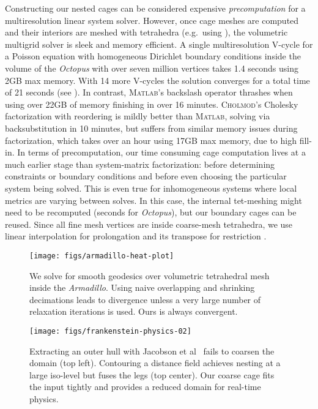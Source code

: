 Constructing our nested cages can be considered expensive \emph{precomputation}
for a multiresolution linear system solver.
%
However, once cage meshes are computed and their interiors are meshed with
tetrahedra (e.g.\ using \cite{tetgen}),
the volumetric multigrid solver is sleek and memory efficient.
%
A single multiresolution V-cycle for a Poisson equation with homogeneous
Dirichlet boundary conditions inside the volume of the \emph{Octopus} with over
seven million vertices takes 1.4 seconds using 2GB max memory. With 14 more
V-cycles the solution converges for a total time of 21 seconds (see
).
%
In contrast, \textsc{Matlab}'s backslash operator thrashes when using over 22GB
of memory finishing in over 16 minutes.
%
\textsc{Cholmod}'s Cholesky factorization with reordering is mildly better than
\textsc{Matlab}, solving via backsubstitution in 10 minutes, but suffers from
similar memory issues during factorization, which takes over
an hour using 17GB max memory, due to high fill-in.
%
In terms of precomputation, our time consuming cage computation lives at a much
earlier stage than system-matrix factorization: before determining constraints
or boundary conditions and before even choosing the particular system being
solved.
%
This is even true for inhomogeneous systems where local metrics are
varying between solves. In this case, the internal tet-meshing might need to be
recomputed (seconds for \emph{Octopus}), but our boundary cages can be reused.
%
Since all fine mesh vertices are inside coarse-mesh tetrahedra, we use linear
interpolation for prolongation and its transpose for restriction
\cite{Demmel04}.

\begin{figure}
  \texttt{[image: figs/armadillo-heat-plot]}
  \caption{We solve for smooth geodesics over volumetric tetrahedral mesh
  inside the \emph{Armadillo}. Using naive overlapping and
  shrinking decimations leads to divergence unless a very large number of
  relaxation iterations is used.  Ours is always convergent.}
  \label{fig:armadillo-heat-plot}
\end{figure}
\begin{figure}
  \texttt{[image: figs/frankenstein-physics-02]}
  \caption{Extracting an outer hull with Jacobson et al~\protect{} fails to coarsen the domain (top
  left). Contouring a distance field achieves nesting at a large
  iso-level but fuses the legs (top center). Our coarse cage fits the input
  tightly and provides a reduced domain for real-time physics.}
  \label{fig:frankenstein-physics}
\end{figure}

